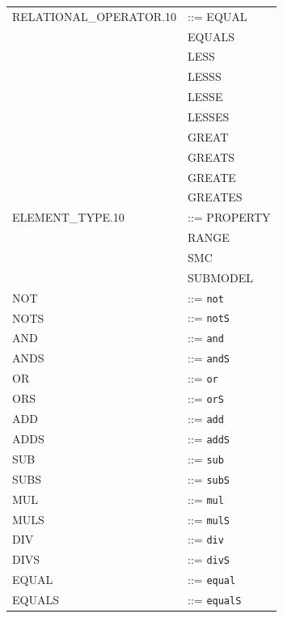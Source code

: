\begin{longtable}{
>{\ttfamily\small}p{}
>{\raggedright\arraybackslash\small}p{}
}
RELATIONAL\_OPERATOR.10 & ::= EQUAL\\
& \textbar{} EQUALS\\
& \textbar{} LESS\\
& \textbar{} LESSS\\
& \textbar{} LESSE\\
& \textbar{} LESSES\\
& \textbar{} GREAT\\
& \textbar{} GREATS\\
& \textbar{} GREATE\\
& \textbar{} GREATES\\

ELEMENT\_TYPE.10 & ::= PROPERTY\\
& \textbar{} RANGE\\
& \textbar{} SMC\\
& \textbar{} SUBMODEL\\

NOT & ::= \texttt{not}\\

NOTS & ::= \texttt{notS}\\

AND & ::= \texttt{and}\\

ANDS & ::= \texttt{andS}\\

OR & ::= \texttt{or}\\

ORS & ::= \texttt{orS}\\

ADD & ::= \texttt{add}\\

ADDS & ::= \texttt{addS}\\

SUB & ::= \texttt{sub}\\

SUBS & ::= \texttt{subS}\\

MUL & ::= \texttt{mul}\\

MULS & ::= \texttt{mulS}\\

DIV & ::= \texttt{div}\\

DIVS & ::= \texttt{divS}\\

EQUAL & ::= \texttt{equal}\\

EQUALS & ::= \texttt{equalS}\\


\end{longtable}
